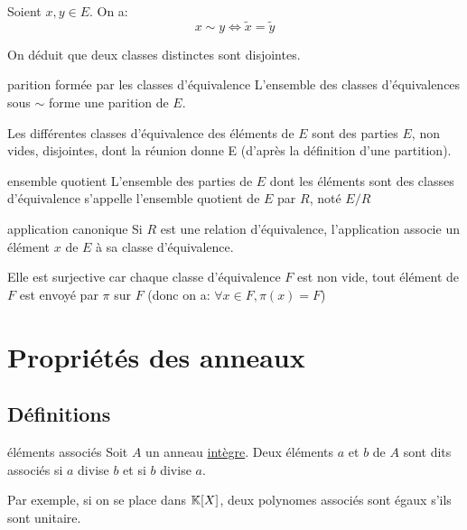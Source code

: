 \begin{lemma}{}{}
    Soient $x, y \in E$. On a:
    \[ x \sim y \Longleftrightarrow \tilde{x} = \tilde{y} \]
\end{lemma}

On déduit que deux classes distinctes sont disjointes.

\begin{theorem}{parition formée par les classes d'équivalence}{}
    L'ensemble des classes d'équivalences sous $\sim$ forme une parition de $E$.
\end{theorem}

Les différentes classes d'équivalence des éléments de $E$ sont des parties $E$, non vides, disjointes, dont la réunion donne E (d'après la définition d'une partition).

\begin{definition}{ensemble quotient}{}
    L'ensemble des parties de $E$ dont les éléments sont des classes d'équivalence s'appelle l'ensemble quotient de $E$ par $R$,
    noté $E/R$
\end{definition}

\begin{proposition}{application canonique}{}
    Si $R$ est une relation d'équivalence, l'application 
    associe un élément $x$ de $E$ à sa classe d'équivalence.

    Elle est surjective car chaque classe d'équivalence $F$ est non vide, tout élément de $F$ est envoyé par
    $\pi$ sur $F$ (donc on a: $\forall x \in F, \pi(x) = F$)
\end{proposition}








\section{Propriétés des anneaux}

\subsection{Définitions}

\begin{definition}{éléments associés}{}
    Soit $A$ un anneau \underline{intègre}.
    Deux éléments $a$ et $b$ de $A$ sont dits associés si $a$ divise $b$ et si $b$ divise $a$.
\end{definition}

Par exemple, si on se place dans $\mathbb{K}[X]$, deux polynomes associés sont égaux s'ils sont unitaire.

